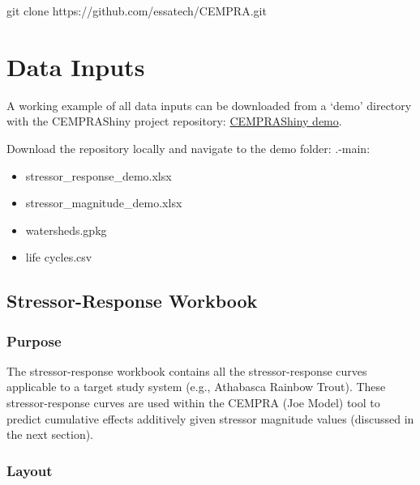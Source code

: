 \documentclass[
  letterpaper,
  DIV=11,
  numbers=noendperiod]{scrreprt}
\newenvironment{Shaded}{\begin{snugshade}}{\end{snugshade}}
\newcommand{\FunctionTok}[1]{\textcolor[rgb]{0.28,0.35,0.67}{#1}}
\newcommand{\NormalTok}[1]{\textcolor[rgb]{0.00,0.23,0.31}{#1}}
\providecommand{\tightlist}{%
  \setlength{\itemsep}{0pt}\setlength{\parskip}{0pt}}\usepackage{longtable,booktabs,array}
\begin{document}
\begin{Shaded}
\begin{Highlighting}[]
\FunctionTok{git}\NormalTok{ clone https://github.com/essatech/CEMPRA.git}
\end{Highlighting}
\end{Shaded}


\hypertarget{data-inputs}{%
\chapter{Data Inputs}\label{data-inputs}}

A working example of all data inputs can be downloaded from a `demo'
directory with the CEMPRAShiny project repository:
\href{https://github.com/essatech/CEMPRAShiny/tree/main/data/demo}{CEMPRAShiny
demo}.

Download the repository locally and navigate to the demo folder:
.\CEMPRAShiny-main\data\demo:

\begin{itemize}
\tightlist
\item
  stressor\_response\_demo.xlsx
\item
  stressor\_magnitude\_demo.xlsx
\item
  watersheds.gpkg
\item
  life cycles.csv
\end{itemize}

\hypertarget{stressor-response-workbook}{%
\section{Stressor-Response Workbook}\label{stressor-response-workbook}}

\hypertarget{purpose-1}{%
\subsection{Purpose}\label{purpose-1}}

The stressor-response workbook contains all the stressor-response curves
applicable to a target study system (e.g., Athabasca Rainbow Trout).
These stressor-response curves are used within the CEMPRA (Joe Model)
tool to predict cumulative effects additively given stressor magnitude
values (discussed in the next section).

\hypertarget{layout}{%
\subsection{Layout}\label{layout}}
\end{document}
